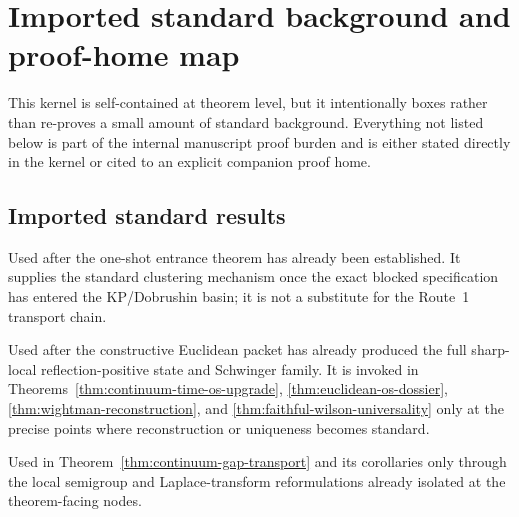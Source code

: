 \section{Imported standard background and proof-home map}\label{app:kernel-imports}

This kernel is self-contained at theorem level, but it intentionally boxes rather than re-proves a small amount of standard background. Everything not listed below is part of the internal manuscript proof burden and is either stated directly in the kernel or cited to an explicit companion proof home.

\subsection*{Imported standard results}
\begin{description}[leftmargin=2.2em,style=nextline]
\item[KP/Dobrushin entrance-to-clustering package.] Used after the one-shot entrance theorem has already been established. It supplies the standard clustering mechanism once the exact blocked specification has entered the KP/Dobrushin basin; it is not a substitute for the Route~1 transport chain.
\item[Standard OS reconstruction / analytic continuation / uniqueness theorem family.] Used after the constructive Euclidean packet has already produced the full sharp-local reflection-positive state and Schwinger family. It is invoked in Theorems~\ref{thm:continuum-time-os-upgrade}, \ref{thm:euclidean-os-dossier}, \ref{thm:wightman-reconstruction}, and \ref{thm:faithful-wilson-universality} only at the precise points where reconstruction or uniqueness becomes standard.
\item[Spectral theorem and semigroup calculus.] Used in Theorem~\ref{thm:continuum-gap-transport} and its corollaries only through the local semigroup and Laplace-transform reformulations already isolated at the theorem-facing nodes.
\end{description}

